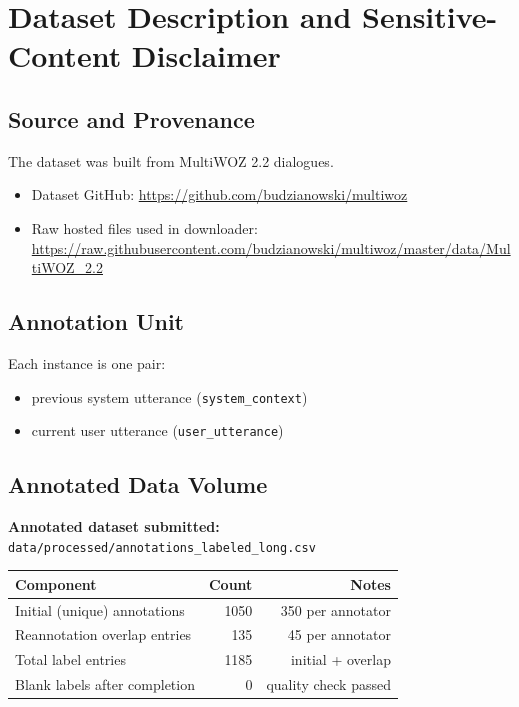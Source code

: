 \documentclass[11pt]{article}
\begin{document}
\section{Dataset Description and Sensitive-Content Disclaimer}
\subsection{Source and Provenance}
The dataset was built from MultiWOZ 2.2 dialogues.
\begin{itemize}
  \item Dataset GitHub: \url{https://github.com/budzianowski/multiwoz}
  \item Raw hosted files used in downloader:
  \url{https://raw.githubusercontent.com/budzianowski/multiwoz/master/data/MultiWOZ_2.2}
\end{itemize}

\subsection{Annotation Unit}
Each instance is one pair:
\begin{itemize}
  \item previous system utterance (\texttt{system\_context})
  \item current user utterance (\texttt{user\_utterance})
\end{itemize}

\subsection{Annotated Data Volume}
\textbf{Annotated dataset submitted:} \texttt{data/processed/annotations\_labeled\_long.csv}
\par\medskip

\begin{center}
\begin{tabular}{lrr}
\toprule
\textbf{Component} & \textbf{Count} & \textbf{Notes} \\
\midrule
Initial (unique) annotations & 1050 & 350 per annotator \\
Reannotation overlap entries & 135 & 45 per annotator \\
Total label entries & 1185 & initial + overlap \\
Blank labels after completion & 0 & quality check passed \\
\bottomrule
\end{tabular}
\end{center}
\end{document}
